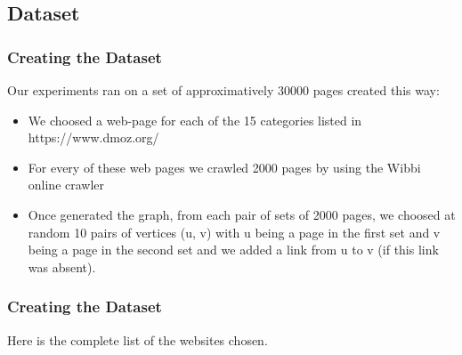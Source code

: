 \documentclass{beamer}
\begin{document}
\subsection{Dataset}
\begin{frame}
\frametitle{Creating the Dataset}
Our experiments ran on a set of approximatively 30000 pages created this way:
\begin{itemize}
\item We choosed a web-page for each of the 15 categories listed in https://www.dmoz.org/
\item For every of these web pages we crawled 2000 pages by using the Wibbi online crawler
\item Once generated the graph, from each pair of sets of 2000 pages, we choosed at random 10 pairs of vertices (u, v) with u being a page in the first set and v being a page in the second set and we added a link from u to v (if this link was absent).
\end{itemize}
\end{frame}

\begin{frame}
\frametitle{Creating the Dataset}
Here is the complete list of the websites chosen.
\begin{table}[]
	\centering
\end{table}
\end{frame}
\end{document}
